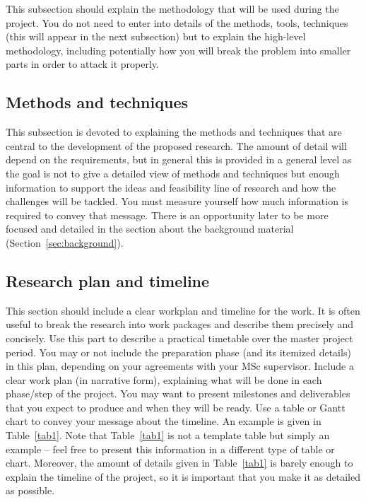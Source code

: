 \documentclass{article}
\begin{document}
This subsection should explain the methodology that will be used during the project. You do not need to enter into details of the methods, tools, techniques (this will appear in the next subsection) but to explain the high-level methodology, including potentially how you will break the problem into smaller parts in order to attack it properly.

\subsection{Methods and techniques}

This subsection is devoted to explaining the methods and techniques that are central to the development of the proposed research. The amount of detail will depend on the requirements, but in general this is provided in a general level as the goal is not to give a detailed view of methods and techniques but enough information to support the ideas and feasibility line of research and how the challenges will be tackled. You must measure yourself how much information is required to convey that message. There is an opportunity later to be more focused and detailed in the section about the background material (Section~\ref{sec:background}).

\subsection{Research plan and timeline}
This section should include a clear workplan and timeline for the work. It is often useful to break the research into work packages and describe them precisely and concisely. Use this part to describe a practical timetable over the master project period. You may or not include the preparation phase (and its itemized details) in this plan, depending on your agreements with your MSc supervisor. Include a clear work plan (in narrative form), explaining what will be done in each phase/step of the project. You may want to present milestones and deliverables that you expect to produce and when they will be ready. Use a table or Gantt chart to convey your message about the timeline. An example is given in Table~\ref{tab1}. Note that Table~\ref{tab1} is not a template table but simply an example -- feel free to present this information in a different type of table or chart. Moreover, the amount of details given in Table~\ref{tab1} is barely enough to explain the timeline of the project, so it is important that you make it as detailed as possible.
\end{document}
